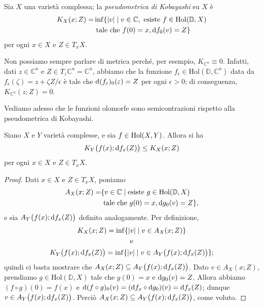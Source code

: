 \begin{defn}
    Sia $X$ una varietà complessa; la \textit{pseudometrica di Kobayashi} su $X$ è
    \begin{equation}\begin{split}
        K_X(x;Z)=&\inf\{|v| \mid v \in \mathbb{C}, \text{ esiste }f \in \text{Hol}(\mathbb{D},X) \\
        &\text{ tale che } f(0)=x, \mathop{}\!\mathrm{d} f_0(v)=Z\}
    \end{split}\end{equation}
    per ogni $x \in X$ e $Z \in T_xX$.
\end{defn}

\begin{oss} \label{metr_noncr}
    Non possiamo sempre parlare di metrica perché, per esempio, $K_{\mathbb{C}^n}\equiv 0$. Infatti, dati $z\in\mathbb{C}^n$ e $Z\in T_z\mathbb{C}^n=\mathbb{C}^n$, abbiamo che la funzione $f_\epsilon\in\text{Hol}(\mathbb{D},\mathbb{C}^n)$ data da $f_\epsilon(\zeta)=z+\zeta Z/\epsilon$ è tale che $\mathop{}\!\mathrm{d} (f_\varepsilon)_0(\varepsilon)=Z$ per ogni $\epsilon>0$; di conseguenza, $K_{\mathbb{C}^n}(z;Z)=0$.
\end{oss}

Vediamo adesso che le funzioni olomorfe sono semicontrazioni rispetto alla pseudometrica di Kobayashi.

\begin{prop} \label{metrdecr}
    Siano $X$ e $Y$ varietà complesse, e sia $f \in \textnormal{Hol}(X,Y)$. Allora si ha
    \begin{equation}
        K_Y\big(f(x);\mathop{}\!\mathrm{d} f_x(Z)\big) \le K_X(x;Z)
    \end{equation}
    per ogni $x \in X$ e $Z \in T_xX$.
\end{prop}

\begin{proof}
    Dati $x\in X$ e $Z\in T_xX$, poniamo
    \begin{align*}
        A_X(x;Z)=&\{v \in \mathbb{C} \mid \text{esiste }g \in \text{Hol}(\mathbb{D},X) \\
        &\text{ tale che } g(0)=x, \mathop{}\!\mathrm{d} g_0(v)=Z\},
    \end{align*}
    e sia $A_Y\big(f(x);\mathop{}\!\mathrm{d} f_x(Z)\big)$ definito analogamente. Per definizione,
    \begin{gather*}
        K_X(x;Z)=\inf\{|v|\mid v\in A_X(x;Z)\}\\
        \text{ e }\\
        K_Y\big(f(x);\mathop{}\!\mathrm{d} f_x(Z)\big)=\inf\{|v|\mid v\in A_Y\big(f(x);\mathop{}\!\mathrm{d} f_x(Z)\big)\};
    \end{gather*}
    quindi ci basta mostrare che $A_X(x;Z)\subseteq A_Y\big(f(x);\mathop{}\!\mathrm{d} f_x(Z)\big)$. Dato $v\in A_X(x;Z)$, prendiamo $g\in\text{Hol}(\mathbb{D},X)$ tale che $g(0)=x$ e $\mathop{}\!\mathrm{d} g_0(v)=Z$. Allora abbiamo $(f\circ g)(0)=f(x)$ e $\mathop{}\!\mathrm{d}(f\circ g)_0(v)=(\mathop{}\!\mathrm{d} f_x\circ\mathop{}\!\mathrm{d} g_0)(v)=\mathop{}\!\mathrm{d} f_x(Z)$; dunque $v \in A_Y\big(f(x);\mathop{}\!\mathrm{d} f_x(Z)\big)$. Perciò $A_X(x;Z)\subseteq A_Y\big(f(x);\mathop{}\!\mathrm{d} f_x(Z)\big)$, come voluto.
\end{proof}

